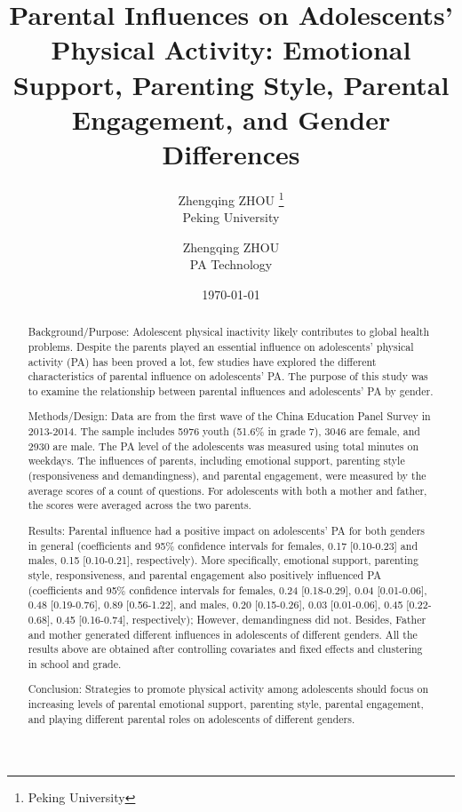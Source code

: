 \documentclass[lang=en, 12pt, a4paper, cite=super, chinesefont=Mac-default]{elegantpaper}
\title{Parental Influences on Adolescents’ Physical Activity: Emotional Support, Parenting Style, Parental Engagement, and Gender Differences}
\author{Zhengqing ZHOU \thanks{Peking University} \\ Peking University \and Zhengqing ZHOU \\ PA Technology}
\institute{\href{https://pe.pku.edu.cn/}{Department of Physical Education}}
\date{\today}
\begin{document}
{\selectfont
\clearpage
\maketitle
\thispagestyle{empty}

\begin{abstract}
{\selectfont
Background/Purpose: Adolescent physical inactivity likely contributes to global health problems. Despite the parents played an essential influence on adolescents’ physical activity (PA) has been proved a lot, few studies have explored the different characteristics of parental influence on adolescents’ PA. The purpose of this study was to examine the relationship between parental influences and adolescents’ PA by gender.

Methods/Design: Data are from the first wave of the China Education Panel Survey in 2013-2014. The sample includes 5976 youth (51.6\% in grade 7), 3046 are female, and 2930 are male. The PA level of the adolescents was measured using total minutes on weekdays. The influences of parents, including emotional support, parenting style (responsiveness and demandingness), and parental engagement, were measured by the average scores of a count of questions. For adolescents with both a mother and father, the scores were averaged across the two parents.

Results: Parental influence had a positive impact on adolescents’ PA for both genders in general (coefficients and 95\% confidence intervals for females, 0.17 [0.10-0.23] and males, 0.15 [0.10-0.21], respectively). More specifically, emotional support, parenting style, responsiveness, and parental engagement also positively influenced PA (coefficients and 95\% confidence intervals for females, 0.24 [0.18-0.29], 0.04 [0.01-0.06], 0.48 [0.19-0.76], 0.89 [0.56-1.22], and males, 0.20 [0.15-0.26], 0.03 [0.01-0.06], 0.45 [0.22-0.68], 0.45 [0.16-0.74], respectively); However, demandingness did not. Besides, Father and mother generated different influences in adolescents of different genders. All the results above are obtained after controlling covariates and fixed effects and clustering in school and grade.

Conclusion: Strategies to promote physical activity among adolescents should focus on increasing levels of parental emotional support, parenting style, parental engagement, and playing different parental roles on adolescents of different genders.

    \par
{}
}
\end{abstract}

}
\end{document}
